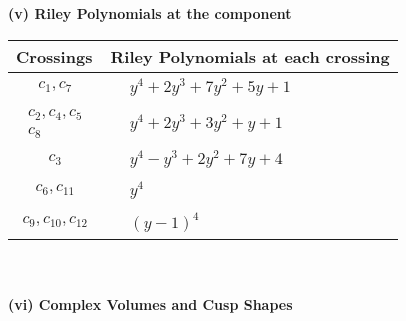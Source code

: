\documentclass[1p]{elsarticle_modified}
\theoremstyle{definition}
\begin{document}
\newpage\renewcommand{\arraystretch}{1}
\flushleft \textbf{(v) Riley Polynomials at the component}\newline \\
\begin{tabular}{m{50pt}|m{274pt}}
Crossings & \hspace{64pt}Riley Polynomials at each crossing \\
\hline $$\begin{aligned}c_{1},c_{7}\end{aligned}$$&$\begin{aligned}
&y^4+2 y^3+7 y^2+5 y+1
\end{aligned}$\\
\hline $$\begin{aligned}c_{2},c_{4},c_{5}\\c_{8}\end{aligned}$$&$\begin{aligned}
&y^4+2 y^3+3 y^2+y+1
\end{aligned}$\\
\hline $$\begin{aligned}c_{3}\end{aligned}$$&$\begin{aligned}
&y^4- y^3+2 y^2+7 y+4
\end{aligned}$\\
\hline $$\begin{aligned}c_{6},c_{11}\end{aligned}$$&$\begin{aligned}
&y^4
\end{aligned}$\\
\hline $$\begin{aligned}c_{9},c_{10},c_{12}\end{aligned}$$&$\begin{aligned}
&(y-1)^4
\end{aligned}$\\
\hline
\end{tabular}\\~\\
\newpage\flushleft \textbf{(vi) Complex Volumes and Cusp Shapes}
\end{document}
